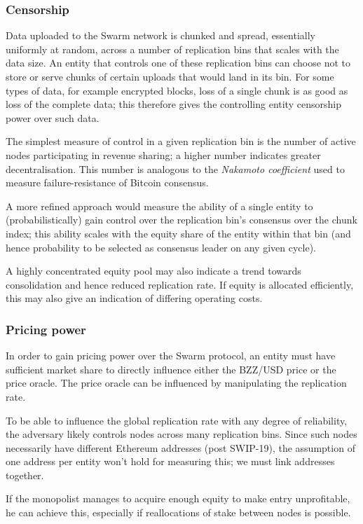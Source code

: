 \subsubsection{Censorship}

Data uploaded to the Swarm network is chunked and spread, essentially uniformly at random, across a number of replication bins that scales with the data size.
%
An entity that controls one of these replication bins can choose not to store or serve chunks of certain uploads that would land in its bin.
%
For some types of data, for example encrypted blocks, loss of a single chunk is as good as loss of the complete data; this therefore gives the controlling entity censorship power over such data.

The simplest measure of control in a given replication bin is the number of active nodes participating in revenue sharing; a higher number indicates greater decentralisation.
%
This number is analogous to the \emph{Nakamoto coefficient} used to measure failure-resistance of Bitcoin consensus.

A more refined approach would measure the ability of a single entity to (probabilistically) gain control over the replication bin's consensus over the chunk index; this ability scales with the equity share of the entity within that bin (and hence probability to be selected as consensus leader on any given cycle).

A highly concentrated equity pool may also indicate a trend towards consolidation and hence reduced replication rate. 
%
If equity is allocated efficiently, this may also give an indication of differing operating costs.

\subsubsection{Pricing power}
%
In order to gain pricing power over the Swarm protocol, an entity must have sufficient market share to directly influence either the BZZ/USD price or the price oracle.
%
The price oracle can be influenced by manipulating the replication rate.

To be able to influence the global replication rate with any degree of reliability, the adversary likely controls nodes across many replication bins.
%
Since such nodes necessarily have different Ethereum addresses (post SWIP-19), the assumption of one address per entity won't hold for measuring this; we must link addresses together.

If the monopolist manages to acquire enough equity to make entry unprofitable, he can achieve this, especially if reallocations of stake between nodes is possible.

